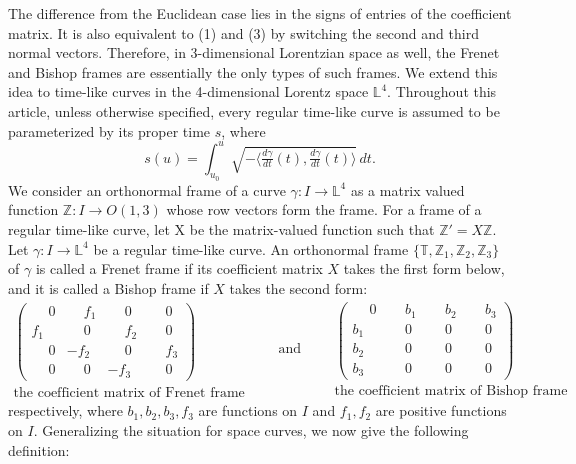 \documentclass[a4paper]{amsart}
\theoremstyle{definition}
\theoremstyle{remark}
\newcommand{\TT}{\mathbb{T}}
\newcommand{\ZZ}{\mathbb{Z}}
\newcommand{\LL}{\mathbb{L}}
\numberwithin{equation}{section}
\begin{document}
The difference from the Euclidean case lies in the signs of entries of the coefficient matrix. It is also equivalent to (1) and (3) by switching the second and third normal vectors. Therefore, in 3-dimensional Lorentzian space as well, the Frenet and Bishop frames are essentially the only types of such frames. We extend this idea to time-like curves in the 4-dimensional Lorentz space $\LL^{4}$.
Throughout this article, unless otherwise specified, every regular time-like curve is assumed to be parameterized by its proper time \(s\), where
\[
s(u)=\int_{u_0}^{u} \sqrt{-\bigl\langle \tfrac{d\gamma}{dt}(t), \tfrac{d\gamma}{dt}(t) \bigr\rangle}\, dt.
\]
 We consider an orthonormal frame of a curve $\gamma : I \to \LL^{4}$ as a matrix valued function $\ZZ : I \to O(1,3)$ whose row vectors form the frame. For a frame of a regular time-like curve, let X be the matrix-valued function such that $\ZZ'=X\ZZ$.
Let $\gamma : I \to \LL^{4}$ be a regular time-like curve. 
An orthonormal frame $\{\TT, \ZZ_1, \ZZ_2, \ZZ_3\}$ of $\gamma$ is called a Frenet frame if its coefficient matrix $X$ takes the first form below, 
and it is called a Bishop frame if $X$ takes the second form:
\[
\begin{array}{c}
\begin{pmatrix}
\phantom{-}0&\phantom{-}f_{1}&\phantom{-}0&\phantom{-}0\\
f_{1}&\phantom{-}0&\phantom{-}f_{2}&\phantom{-}0\\
\phantom{-}0&-f_{2}&\phantom{-}0&\phantom{-}f_{3}\\
\phantom{-}0&\phantom{-}0&-f_{3}&\phantom{-}0
\end{pmatrix}\\[6pt]
\text{the coefficient matrix of Frenet frame}
\end{array}
\qquad\text{and}\qquad
\begin{array}{c}
\begin{pmatrix}
\phantom{-}0&\phantom{-}b_{1}&\phantom{-}b_{2}&\phantom{-}b_{3}\\
b_{1}&\phantom{-}0&\phantom{-}0&\phantom{-}0\\
b_{2}&\phantom{-}0&\phantom{-}0&\phantom{-}0\\
b_{3}&\phantom{-}0&\phantom{-}0&\phantom{-}0
\end{pmatrix}\\[6pt]
\text{the coefficient matrix of Bishop frame}
\end{array}
\]
respectively, where $b_1, b_2, b_3, f_3$ are functions on $I$ and $f_1, f_2$ are positive functions on $I$. Generalizing the situation for space curves, we now give the following definition:
\end{document}
